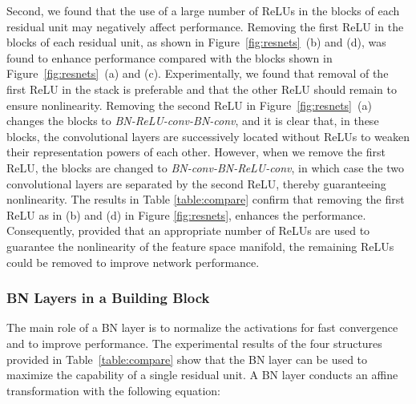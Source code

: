 \documentclass[10pt,twocolumn,letterpaper]{article}
\begin{document}
Second, we found that the use of a large number of ReLUs in the blocks of each residual unit may negatively affect performance. Removing the first ReLU in the blocks of each residual unit, as shown in Figure~\ref{fig:resnets}~(b) and (d), was found to enhance performance compared with the blocks shown in Figure~\ref{fig:resnets}~(a) and (c). Experimentally, we found that removal of the first ReLU in the stack is preferable and that the other ReLU should remain to ensure nonlinearity.
Removing the second ReLU in Figure~\ref{fig:resnets}~(a) changes the blocks to {\it BN-ReLU-conv-BN-conv}, and it is clear that, in these blocks, the convolutional layers are successively located without ReLUs to weaken their representation powers of each other. However, when we remove the first ReLU, the blocks are changed to {\it BN-conv-BN-ReLU-conv}, in which case the two convolutional layers are separated by the second ReLU, thereby guaranteeing nonlinearity.
The results in Table \ref{table:compare} confirm that removing the first ReLU as in (b) and (d) in Figure \ref{fig:resnets}, enhances the performance. Consequently, provided that an appropriate number of ReLUs are used to guarantee the nonlinearity of the feature space manifold, the remaining ReLUs could be removed to improve network performance.


\subsubsection{BN Layers in a Building Block}
The main role of a BN layer is to normalize the activations for fast convergence and to improve performance.
The experimental results of the four structures provided in Table~\ref{table:compare} show that the BN layer can be used to maximize the capability of a single residual unit. A BN layer conducts an affine transformation with the following equation:
\end{document}
